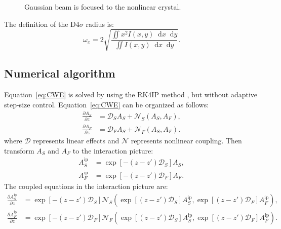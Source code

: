 \documentclass[a4paper,10pt]{ctexart}
\newcommand{\dd}{\mathop{}\!\mathrm{d}}
\begin{document}
\begin{figure}[t]
  \centering
  \caption{Gaussian beam is focused to the nonlinear crystal.}
  \label{fig:gaussian-beam}
\end{figure}

The definition of the D4$\sigma$ radius is:
\begin{equation}
  \omega_x=2\sqrt{\frac{\iint x^2I(x,y)\dd x\dd y}
    {\iint I(x,y)\dd x\dd y}}.
\end{equation}

\subsection{Numerical algorithm}
Equation~\eqref{eq:CWE} is solved by using the RK4IP method
\cite{balac_embedded_2013}, but without adaptive step-size control.
Equation~\eqref{eq:CWE} can be organized as follows:
\begin{equation}
  \begin{aligned}
    \frac{\partial A_S}{\partial z}
     & =\mathcal{D}_SA_S+\mathcal{N}_S(A_S,A_F), \\
    \frac{\partial A_F}{\partial z}
     & =\mathcal{D}_FA_S+\mathcal{N}_F(A_S,A_F).
  \end{aligned}
\end{equation}
where $\mathcal{D}$ represents linear effects and $\mathcal{N}$ represents
nonlinear coupling. Then transform $A_S$ and $A_F$ to the interaction picture:
\begin{equation}
  \begin{aligned}
    A_S^{\mathrm{ip}} & =\exp[-(z-z')\mathcal{D}_S]A_S, \\
    A_F^{\mathrm{ip}} & =\exp[-(z-z')\mathcal{D}_F]A_F.
  \end{aligned}
\end{equation}
The coupled equations in the interaction picture are:
\begin{equation}
  \begin{aligned}
    \frac{\partial A_S^{\mathrm{ip}}}{\partial z}
     & =\exp[-(z-z')\mathcal{D}_S]\mathcal{N}_S
    \left(\exp[(z-z')\mathcal{D}_S]A_S^{\mathrm{ip}},
    \exp[(z-z')\mathcal{D}_F]A_F^{\mathrm{ip}}\right), \\
    \frac{\partial A_F^{\mathrm{ip}}}{\partial z}
     & =\exp[-(z-z')\mathcal{D}_F]\mathcal{N}_F
    \left(\exp[(z-z')\mathcal{D}_S]A_S^{\mathrm{ip}},
    \exp[(z-z')\mathcal{D}_F]A_F^{\mathrm{ip}}\right).
  \end{aligned}
  \label{eq:IP-CWE}
\end{equation}
\end{document}
